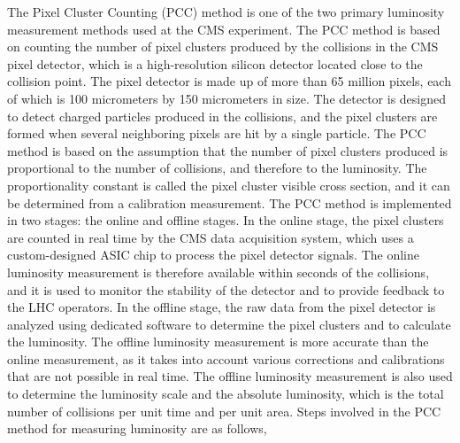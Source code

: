 The Pixel Cluster Counting (PCC) method is one of the two primary luminosity measurement methods used at the CMS experiment. The PCC method is based on counting the number of pixel clusters produced by the collisions in the CMS pixel detector, which is a high-resolution silicon detector located close to the collision point. The pixel detector is made up of more than 65 million pixels, each of which is 100 micrometers by 150 micrometers in size. The detector is designed to detect charged particles produced in the collisions, and the pixel clusters are formed when several neighboring pixels are hit by a single particle. The PCC method is based on the assumption that the number of pixel clusters produced is proportional to the number of collisions, and therefore to the luminosity. The proportionality constant is called the pixel cluster visible cross section, and it can be determined from a calibration measurement. The PCC method is implemented in two stages: the online and offline stages. In the online stage, the pixel clusters are counted in real time by the CMS data acquisition system, which uses a custom-designed ASIC chip to process the pixel detector signals. The online luminosity measurement is therefore available within seconds of the collisions, and it is used to monitor the stability of the detector and to provide feedback to the LHC operators. In the offline stage, the raw data from the pixel detector is analyzed using dedicated software to determine the pixel clusters and to calculate the luminosity. The offline luminosity measurement is more accurate than the online measurement, as it takes into account various corrections and calibrations that are not possible in real time. The offline luminosity measurement is also used to determine the luminosity scale and the absolute luminosity, which is the total number of collisions per unit time and per unit area. Steps involved in the PCC method for measuring luminosity are as follows,

